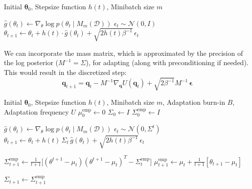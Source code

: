     \begin{algorithm}
      \caption{SGLD}\label{alg:sgld}
      \begin{algorithmic}

      \Require Initial $\boldsymbol{\theta}_0$, Stepsize function $h(t)$, Minibatch size $m$

          \State $\hat{g}(\theta_t) \gets \nabla_\theta \log{p(\theta_t \mid M_m(\mathcal{D}))}$
          \State $\epsilon_t \sim \mathcal{N}(0, I)$
          \State $\theta_{t+1} \gets \theta_t + h(t) \cdot \hat{g}(\theta_t) + \sqrt{2 h(t) \beta^{-1}} \, \epsilon_t$
      \EndFor

      \end{algorithmic}
    \end{algorithm}

    We can incorporate the mass matrix, which is approximated by the precision of the log posterior ($M^{-1} = \Sigma$), for adapting (along with preconditioning if needed). This would result in the discretized step: 
    \begin{equation}
      \mathbf{q}_{t+1} = \mathbf{q}_t - M^{-1} \nabla_{\mathbf{q}} U(\mathbf{q}_t) + \sqrt{2 \beta^{-1}} M^{-1} \, \boldsymbol{\epsilon}
    \end{equation}

    \begin{algorithm}
      \caption{Adaptive SGLD}\label{alg:adaptive_sgld}
      \begin{algorithmic}

      \Require Initial $\boldsymbol{\theta}_0$, Stepsize function $h(t)$, Minibatch size $m$, Adaptation burn-in $B$, Adaptation frequency $U$
      \State $\mu_0^{\mathrm{emp}} \gets 0$
      \State $\Sigma_0 \gets I$
      \State $\Sigma_0^{\mathrm{emp}} \gets I$

          \State $\hat{g}(\theta_t) \gets \nabla_\theta \log{p(\theta_t \mid M_m(\mathcal{D}))}$
          \State $\epsilon_t \sim \mathcal{N}(0, \Sigma^t)$
          \State $\theta_{t+1} \gets \theta_t + h(t) \, \Sigma_t \, \hat{g}(\theta_t) + \sqrt{2 h(t) \beta^{-1}} \, \epsilon_t$
          
          \State $\Sigma^\mathrm{emp}_{t+1} \gets \frac{1}{t+1} \big[(\theta^{t+1} - \mu_t) (\theta^{t+1} - \mu_t)^T - \Sigma^\mathrm{emp}_t \big]$
          \State $\mu_{t+1}^\mathrm{emp} \gets \mu_t + \frac{1}{t+1} [ \theta_{t+1} - \mu_t ]$
          
              \State $\Sigma_{t+1} \gets \Sigma_{t+1}^{\mathrm{emp}}$
          \EndIf
      \EndFor

      \end{algorithmic}
    \end{algorithm}

